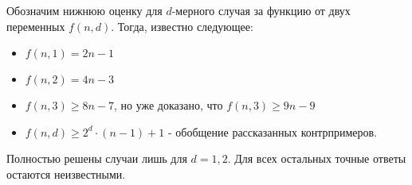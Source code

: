 Обозначим нижнюю оценку для $d$-мерного случая за функцию от двух переменных $f(n, d)$. Тогда, известно следующее:
\begin{itemize}
	\item \(f(n, 1) = 2n - 1\)
	
	\item \(f(n, 2) = 4n - 3\)
	
	\item \(f(n, 3) \ge 8n - 7\), но уже доказано, что $f(n, 3) \ge 9n - 9$
	
	\item \(f(n, d) \ge 2^d \cdot (n - 1) + 1\) - обобщение рассказанных контрпримеров.
\end{itemize}
Полностью решены случаи лишь для $d = 1, 2$. Для всех остальных точные ответы остаются неизвестными.